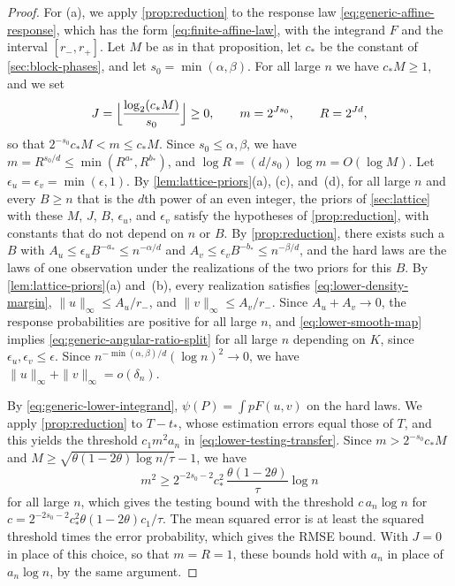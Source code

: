 \begin{proof}
For (a), we apply \cref{prop:reduction} to the response law
\eqref{eq:generic-affine-response}, which has the form
\eqref{eq:finite-affine-law}, with the integrand $F$ and the interval
$[r_-,r_+]$. Let $M$ be as in that proposition, let $c_*$ be the
constant of \cref{sec:block-phases}, and let
$s_0=\min(\alpha,\beta)$. For all large $n$ we have $c_*M\ge1$, and we
set
\[
 J=\Bigl\lfloor\frac{\log_2(c_*M)}{s_0}\Bigr\rfloor\ge0,\qquad
 m=2^{Js_0},\qquad R=2^{Jd},
\]
so that $2^{-s_0}c_*M<m\le c_*M$. Since $s_0\le\alpha,\beta$, we have
$m=R^{s_0/d}\le\min(R^{a_*},R^{b_*})$, and
$\log R=(d/s_0)\log m=O(\log M)$. Let
$\epsilon_u=\epsilon_v=\min(\epsilon,1)$. By
\cref{lem:lattice-priors}(a), (c), and~(d), for all large $n$ and
every $B\ge n$ that is the $d$th power of an even integer, the priors of
\cref{sec:lattice} with these $M$, $J$, $B$, $\epsilon_u$, and
$\epsilon_v$ satisfy the hypotheses of
\cref{prop:reduction}, with constants that do
not depend on $n$ or $B$. By \cref{prop:reduction}, there
exists such a $B$ with $A_u\le\epsilon_uB^{-a_*}\le n^{-\alpha/d}$ and
$A_v\le\epsilon_vB^{-b_*}\le n^{-\beta/d}$, and the hard laws are the
laws of one observation under the realizations of the two priors for
this $B$. By \cref{lem:lattice-priors}(a) and~(b), every
realization satisfies \eqref{eq:lower-density-margin},
$\|u\|_\infty\le A_u/r_-$, and $\|v\|_\infty\le A_v/r_-$. Since
$A_u+A_v\to0$, the response probabilities are positive for all large
$n$, and \eqref{eq:lower-smooth-map} implies
\eqref{eq:generic-angular-ratio-split} for all large $n$ depending on
$K$, since $\epsilon_u,\epsilon_v\le\epsilon$. Since
$n^{-\min(\alpha,\beta)/d}(\log n)^2\to0$, we have
$\|u\|_\infty+\|v\|_\infty=o(\delta_n)$.

By \eqref{eq:generic-lower-integrand}, $\psi(P)=\int pF(u,v)$ on the
hard laws. We apply \cref{prop:reduction} to $T-t_*$, whose
estimation errors equal those of $T$, and this yields the threshold
$c_1m^2a_n$ in \eqref{eq:lower-testing-transfer}. Since
$m>2^{-s_0}c_*M$ and
$M\ge\sqrt{\theta(1-2\theta)\log n/\tau}-1$, we have
\[
 m^2\ge2^{-2s_0-2}c_*^2\,\frac{\theta(1-2\theta)}{\tau}\log n
\]
for all large $n$, which gives the testing bound with the threshold
$c\,a_n\log n$ for $c=2^{-2s_0-2}c_*^2\theta(1-2\theta)c_1/\tau$.
The mean squared error is at least the squared threshold times the error
probability, which gives the RMSE bound. With $J=0$ in place of this
choice, so that $m=R=1$, these bounds hold with $a_n$ in place of
$a_n\log n$, by the same argument.


\end{proof}
